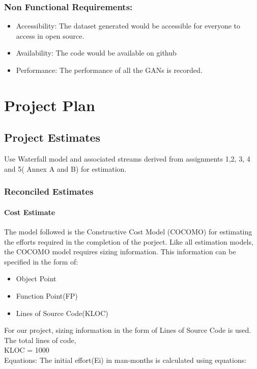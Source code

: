 \documentclass[oneside,a4paper,12pt]{report}
\begin{document}
\subsection{Non Functional Requirements:}
\begin{itemize}
  \item Accessibility: The dataset generated would be accessible for everyone to access in open source.
	\item	Availability: The code would be available on github
  \item Performance: The performance of all the GANs is recorded.
\end{itemize}

\clearpage


\chapter{Project Plan}

\section{Project Estimates}
                 Use Waterfall model and associated streams derived from assignments 1,2, 3, 4 and 5( Annex A and B) for estimation.
\subsection{Reconciled Estimates}
\subsubsection{Cost Estimate}
\hspace*{0.25 in}
The model followed is the Constructive Cost Model (COCOMO) for estimating the
efforts required in the completion of the porject. Like all estimation models, the
COCOMO model requires sizing information. This information can be specified in
the form of:
\begin{itemize}
  \item Object Point
  \item Function Point(FP)
  \item Lines of Source Code(KLOC)
\end{itemize}
For our project, sizing information in the form of Lines of Source Code is used. The
total lines of code,\\
KLOC = 1000\\
Equations: The initial effort(Ei) in man-months is calculated using equations:\\
\end{document}

